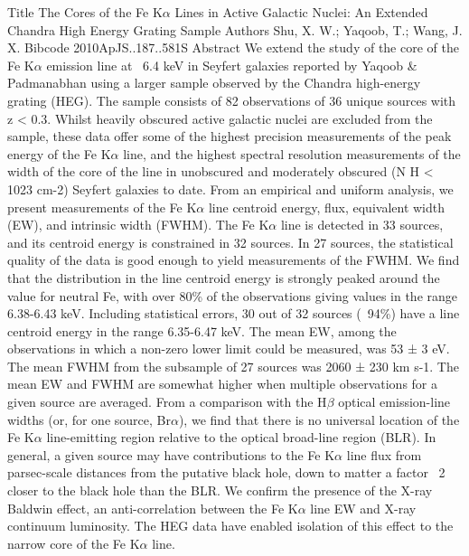 \documentclass[main.tex]{subfiles}
\begin{document}
Title	The Cores of the Fe K$\alpha$ Lines in Active Galactic Nuclei: An Extended Chandra High Energy Grating Sample
Authors	Shu, X. W.; Yaqoob, T.; Wang, J. X.
Bibcode	2010ApJS..187..581S
Abstract	We extend the study of the core of the Fe K$\alpha$ emission line at ~6.4 keV in Seyfert galaxies reported by Yaqoob \& Padmanabhan using a larger sample observed by the Chandra high-energy grating (HEG). The sample consists of 82 observations of 36 unique sources with z < 0.3. Whilst heavily obscured active galactic nuclei are excluded from the sample, these data offer some of the highest precision measurements of the peak energy of the Fe K$\alpha$ line, and the highest spectral resolution measurements of the width of the core of the line in unobscured and moderately obscured (N H < 1023 cm-2) Seyfert galaxies to date. From an empirical and uniform analysis, we present measurements of the Fe K$\alpha$ line centroid energy, flux, equivalent width (EW), and intrinsic width (FWHM). The Fe K$\alpha$ line is detected in 33 sources, and its centroid energy is constrained in 32 sources. In 27 sources, the statistical quality of the data is good enough to yield measurements of the FWHM. We find that the distribution in the line centroid energy is strongly peaked around the value for neutral Fe, with over 80\% of the observations giving values in the range 6.38-6.43 keV. Including statistical errors, 30 out of 32 sources (~94\%) have a line centroid energy in the range 6.35-6.47 keV. The mean EW, among the observations in which a non-zero lower limit could be measured, was 53 ± 3 eV. The mean FWHM from the subsample of 27 sources was 2060 ± 230 km s-1. The mean EW and FWHM are somewhat higher when multiple observations for a given source are averaged. From a comparison with the H$\beta$ optical emission-line widths (or, for one source, Br$\alpha$), we find that there is no universal location of the Fe K$\alpha$ line-emitting region relative to the optical broad-line region (BLR). In general, a given source may have contributions to the Fe K$\alpha$ line flux from parsec-scale distances from the putative black hole, down to matter a factor ~2 closer to the black hole than the BLR. We confirm the presence of the X-ray Baldwin effect, an anti-correlation between the Fe K$\alpha$ line EW and X-ray continuum luminosity. The HEG data have enabled isolation of this effect to the narrow core of the Fe K$\alpha$ line.
\end{document}
